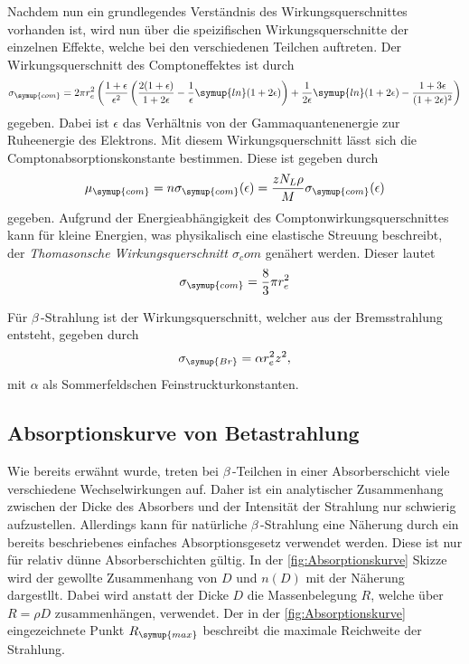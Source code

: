 Nachdem nun ein grundlegendes Verständnis des Wirkungsquerschnittes vorhanden ist, wird nun über die speizifischen Wirkungsquerschnitte der einzelnen Effekte, welche
bei den verschiedenen Teilchen auftreten. 
Der Wirkungsquerschnitt des Comptoneffektes ist durch
\begin{equation}
    \label{eqn:sigma_com}
    \sigma_{\symup{com}} = 2\pi r_{e}^2\left(\frac{1 + \epsilon}{\epsilon^2}\left( \frac{2(1+\epsilon)}{1+2\epsilon} - \frac{1}{\epsilon}\symup{ln}(1+2\epsilon)\right)+\frac{1}{2\epsilon}\symup{ln}(1+2\epsilon) - \frac{1 + 3\epsilon}{(1+2\epsilon)^2}\right)
\end{equation}
gegeben. Dabei ist $\epsilon$ das Verhältnis von der Gammaquantenenergie zur Ruheenergie des Elektrons. Mit diesem Wirkungsquerschnitt lässt sich die Comptonabsorptionskonstante 
bestimmen. Diese ist gegeben durch 
\begin{equation}
    \label{eqn:mu_com}
    \mu_{\symup{com}} = n\sigma_{\symup{com}}(\epsilon) = \frac{zN_L\rho}{M}\sigma_{\symup{com}}(\epsilon)
\end{equation}
gegeben. Aufgrund der Energieabhängigkeit des Comptonwirkungsquerschnittes kann für kleine Energien, was physikalisch eine elastische Streuung beschreibt, der 
\textit{Thomasonsche Wirkungsquerschnitt $\sigma_com$} genähert werden. Dieser lautet 
\begin{equation}
    \sigma_{\symup{com}} = \frac{8}{3}\pi r_e^2
\end{equation}

Für $\beta$\,-Strahlung ist der Wirkungsquerschnitt, welcher aus der Bremsstrahlung entsteht, gegeben durch 
\begin{equation}
    \label{eqn:sigma_br}
    \sigma_{\symup{Br}} = \alpha r_e^2z^2,
\end{equation}
mit $\alpha$ als Sommerfeldschen Feinstruckturkonstanten.

\subsection{Absorptionskurve von Betastrahlung}
\label{subsec:Absorptionskurve}
Wie bereits erwähnt wurde, treten bei $\beta$\,-Teilchen in einer Absorberschicht viele verschiedene Wechselwirkungen auf. Daher ist ein analytischer Zusammenhang zwischen 
der Dicke des Absorbers und der Intensität der Strahlung nur schwierig aufzustellen. Allerdings kann für natürliche  $\beta$\,-Strahlung eine Näherung durch ein bereits 
beschriebenes einfaches Absorptionsgesetz verwendet werden. Diese ist nur für relativ dünne Absorberschichten gültig. In der \autoref{fig:Absorptionskurve} Skizze wird der
gewollte Zusammenhang von $D$ und $n(D)$ mit der Näherung dargestllt. Dabei wird anstatt der Dicke $D$ die Massenbelegung $R$, welche über $R = \rho D$ zusammenhängen, verwendet.
Der in der \autoref{fig:Absorptionskurve} eingezeichnete Punkt $R_{\symup{max}}$ beschreibt die maximale Reichweite der Strahlung.

